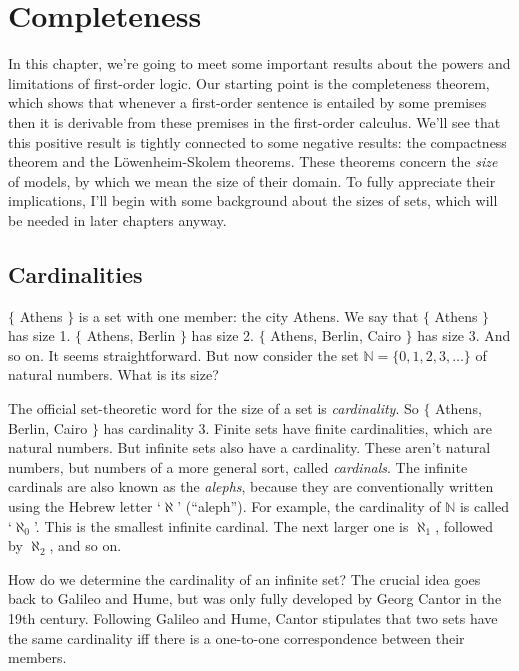 \chapter{Completeness}

In this chapter,
we're going to meet some important results about the powers and limitations of first-order logic.
Our starting point is the completeness theorem,
which shows that
whenever a first-order sentence is entailed by some premises
then it is derivable from these premises in the first-order calculus.
We'll see that this positive result is tightly connected to some negative results:
the compactness theorem and the Löwenheim-Skolem theorems.
These theorems concern the \emph{size} of models,
by which we mean the size of their domain.
To fully appreciate their implications,
I'll begin with some background about the sizes of sets,
which will be needed in later chapters anyway.

\section{Cardinalities}\label{sec:cardinalities}

$\{$ Athens $\}$ is a set with one member:
the city Athens.
We say that $\{$ Athens $\}$ has size 1.
$\{$ Athens, Berlin $\}$ has size 2.
$\{$ Athens, Berlin, Cairo $\}$ has size 3.
And so on.
It seems straightforward.
But now consider the set $\mathbb{N} = \{ 0, 1, 2, 3, \ldots \}$ of natural numbers.
What is its size?

The official set-theoretic word for the size of a set is \textit{cardinality}.
So $\{$ Athens, Berlin, Cairo $\}$ has cardinality 3.
Finite sets have finite cardinalities, which are natural numbers.
But infinite sets also have a cardinality.
These aren't natural numbers,
but numbers of a more general sort,
called \emph{cardinals}.
The infinite cardinals are also known as the \emph{alephs},
because they are conventionally written using the Hebrew letter `$\aleph$' (``aleph'').
For example,
the cardinality of $\mathbb{N}$ is called `$\aleph_0$'.
This is the smallest infinite cardinal.
The next larger one is $\aleph_1$,
followed by $\aleph_2$, and so on.

How do we determine the cardinality of an infinite set?
The crucial idea goes back to Galileo and Hume,
but was only fully developed by Georg Cantor in the 19th century.
Following Galileo and Hume,
Cantor stipulates that
two sets have the same cardinality iff there is a one-to-one correspondence between their members.

